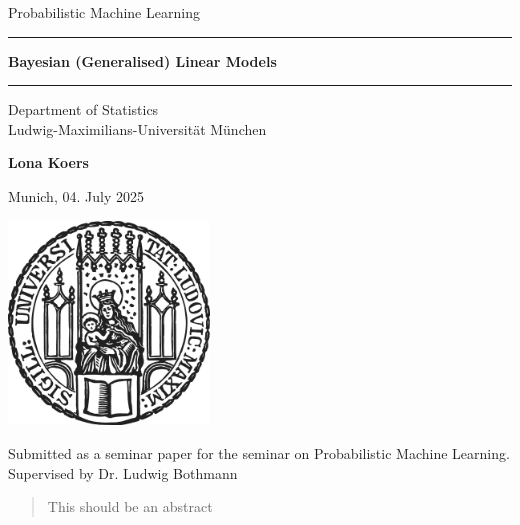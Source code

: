 \documentclass[12pt]{article}
\newcommand{\mytitle}{Bayesian (Generalised) Linear Models}
\newcommand{\myname}{Lona Koers}
\newcommand{\mysupervisor}{Dr. Ludwig Bothmann}
\begin{document}

\begin{titlepage}
\begin{center}

\LARGE
Probabilistic Machine Learning

\vspace{0.5cm}

\rule{\textwidth}{1.5pt}
\LARGE
\textbf{\mytitle}
\rule{\textwidth}{1.5pt}

\vspace{0.5cm}

\large
Department of Statistics \\
Ludwig-Maximilians-Universität München

\vfill

\Large
\textbf{\myname}

\vfill

\large
Munich, 04. July 2025

\vfill

\includegraphics[width = 0.4\textwidth]{sigillum.png}

\vfill

\normalsize
Submitted as a seminar paper for the seminar on Probabilistic Machine Learning.
\\

Supervised by \mysupervisor

\end{center}
\end{titlepage}


\newpage

\begin{abstract}

This should be an abstract

\end{abstract}
\end{document}
